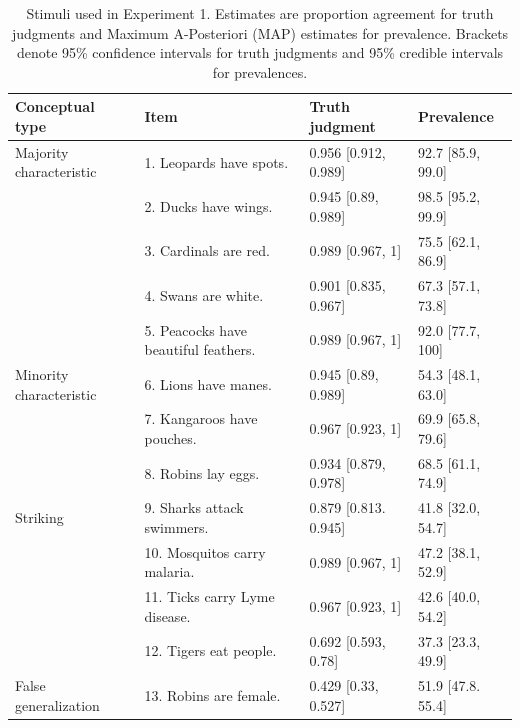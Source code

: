 \documentclass[12pt,letterpaper]{article}
\begin{document}
\begin{table}[h]
\centering

\caption{Stimuli used in Experiment 1. 
Estimates are proportion agreement for truth judgments and Maximum A-Posteriori (MAP) estimates for prevalence. 
Brackets denote 95\% confidence intervals for truth judgments and 95\% credible intervals for prevalences.}
\begin{tabular}{| l | l | p{3.5cm} | p{3.5cm} |}
\hline
Conceptual type & Item & Truth judgment & Prevalence \\
\hline \hline
Majority characteristic       & 1. Leopards have spots.    &0.956	[0.912, 0.989] & 92.7 [85.9, 99.0]\\
                                          & 2. Ducks have wings.                       &0.945	[0.89, 0.989] & 98.5 [95.2, 99.9]\\
                                          & 3. Cardinals are red.                       &0.989	[0.967, 1] & 75.5 [62.1, 86.9]\\
                                          & 4. Swans are white.                       &0.901	[0.835, 0.967] & 67.3 [57.1, 73.8] \\
                                          & 5. Peacocks have beautiful feathers. &  0.989	[0.967, 1] & 92.0 [77.7, 100] \\
Minority characteristic       & 6. Lions have manes.       &0.945	[0.89, 0.989] & 54.3 [48.1, 63.0]\\
                                          & 7. Kangaroos have pouches.                        &0.967 [0.923, 1]& 69.9 [65.8, 79.6]\\
                                          & 8. Robins lay eggs.                        &0.934	[0.879, 0.978]& 68.5 [61.1, 74.9]\\
Striking                      & 9. Sharks attack swimmers. &0.879	[0.813. 0.945] & 41.8 [32.0, 54.7]\\
                                  & 10. Mosquitos carry malaria.                        &0.989	[0.967, 1] & 47.2 [38.1,	 52.9]\\
                                  & 11. Ticks carry Lyme disease.                        &0.967	[0.923, 1] &  42.6 [40.0, 54.2]\\
                                  & 12. Tigers eat people.                        &0.692	[0.593, 0.78] & 37.3 [23.3, 49.9]\\
False generalization & 13. Robins are female.      &0.429	[0.33, 0.527] & 51.9 [47.8. 55.4]\\

\end{tabular}
\end{table}
\end{document}
